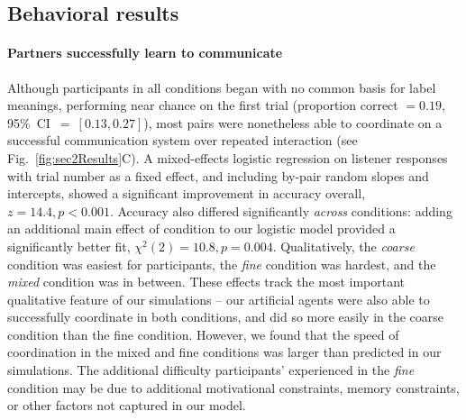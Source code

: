 \subsection{Behavioral results}

\paragraph{Partners successfully learn to communicate}

Although participants in all conditions began with no common basis for label meanings, performing near chance on the first trial (proportion correct $= 0.19$, 95\%~CI~$=~[0.13, 0.27]$), most pairs were nonetheless able to coordinate on a successful communication system over repeated interaction (see Fig.\ \ref{fig:sec2Results}C). 
A mixed-effects logistic regression on listener responses with trial number as a fixed effect, and including by-pair random slopes and intercepts, showed a significant improvement in accuracy overall, $z = 14.4, p < 0.001$. 
Accuracy also differed significantly \emph{across} conditions: adding an additional main effect of condition to our logistic model provided a significantly better fit, $\chi^2(2) = 10.8, p = 0.004$. 
Qualitatively, the \emph{coarse} condition was easiest for participants, the \emph{fine} condition was hardest, and the \emph{mixed} condition was in between.
These effects track the most important qualitative feature of our simulations -- our artificial agents were also able to successfully coordinate in both conditions, and did so more easily in the coarse condition than the fine condition. 
However, we found that the speed of coordination in the mixed and fine conditions was larger than predicted in our simulations.
The additional difficulty participants' experienced in the \emph{fine} condition may be due to additional motivational constraints, memory constraints, or other factors not captured in our model.



